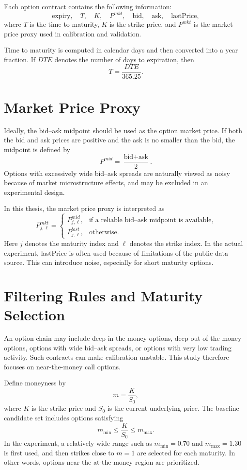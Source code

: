 \documentclass[11pt,a4paper]{report}
\begin{document}
Each option contract contains the following information:
\[
\text{expiry},\quad T,\quad K,\quad P^{mkt},\quad \text{bid},\quad \text{ask},\quad \text{lastPrice},
\]
where $T$ is the time to maturity, $K$ is the strike price, and $P^{mkt}$ is the market price proxy used in calibration and validation.

Time to maturity is computed in calendar days and then converted into a year fraction. If $DTE$ denotes the number of days to expiration, then
\[
T = \frac{DTE}{365.25}.
\]

\section{Market Price Proxy}

Ideally, the bid--ask midpoint should be used as the option market price. If both the bid and ask prices are positive and the ask is no smaller than the bid, the midpoint is defined by
\[
P^{mid}
=
\frac{\text{bid}+\text{ask}}{2}.
\]
Options with excessively wide bid--ask spreads are naturally viewed as noisy because of market microstructure effects, and may be excluded in an experimental design.

In this thesis, the market price proxy is interpreted as
\[
P^{mkt}_{j,\ell}
=
\begin{cases}
P^{mid}_{j,\ell}, & \text{if a reliable bid--ask midpoint is available},\\
P^{last}_{j,\ell}, & \text{otherwise}.
\end{cases}
\]
Here $j$ denotes the maturity index and $\ell$ denotes the strike index. In the actual experiment, lastPrice is often used because of limitations of the public data source. This can introduce noise, especially for short maturity options.

\section{Filtering Rules and Maturity Selection}

An option chain may include deep in-the-money options, deep out-of-the-money options, options with wide bid--ask spreads, or options with very low trading activity. Such contracts can make calibration unstable. This study therefore focuses on near-the-money call options.

Define moneyness by
\[
m = \frac{K}{S_0},
\]
where $K$ is the strike price and $S_0$ is the current underlying price. The baseline candidate set includes options satisfying
\[
m_{\min} \leq \frac{K}{S_0} \leq m_{\max}.
\]
In the experiment, a relatively wide range such as $m_{\min}=0.70$ and $m_{\max}=1.30$ is first used, and then strikes close to $m=1$ are selected for each maturity. In other words, options near the at-the-money region are prioritized.
\end{document}
